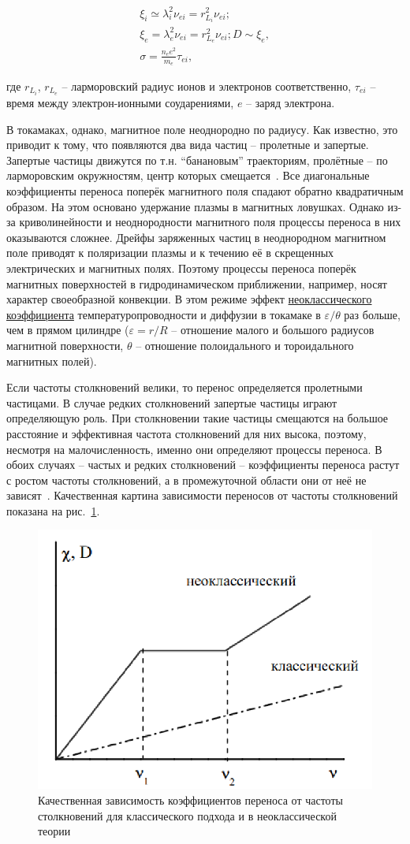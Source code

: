 \documentclass[10pt, a4paper]{article}
\begin{document}
\begin{align*}
	\xi_i \simeq \lambda_i^2\nu_{ei} = r_{L_{i}}^2\nu_{ei}; \\
	\xi_e = \lambda_e^2\nu_{ei} = r_{L_{e}}^2\nu_{ei};
	D \sim \xi_e, \\
	\sigma = \frac{n_e e^2}{m_e}\tau_{ei},
\end{align*}

где $r_{L_{i}}$, $r_{L_{e}}$ -- ларморовский радиус ионов и электронов соответственно, $\tau_{ei}$ -- время между электрон-ионными соударениями, $e$ -- заряд электрона.

В токамаках, однако, магнитное поле неоднородно по радиусу. Как известно, это приводит к тому, что появляются два вида частиц -- пролетные и запертые. Запертые частицы движутся по т.н. ``банановым'' траекториям, пролётные -- по ларморовским окружностям, центр которых смещается~\cite{kirneva}. Все диагональные коэффициенты переноса поперёк магнитного поля спадают обратно квадратичным образом. На этом основано удержание плазмы в магнитных ловушках. Однако из-за криволинейности и неоднородности магнитного поля процессы переноса в них оказываются сложнее. Дрейфы заряженных частиц в неоднородном магнитном поле приводят к поляризации плазмы и к течению её в скрещенных электрических и магнитных полях. Поэтому процессы переноса поперёк магнитных поверхностей в гидродинамическом приближении, например, носят характер своеобразной конвекции. В этом режиме эффект \uline{неоклассического коэффициента} температуропроводности и диффузии в токамаке в $\varepsilon/\theta$ раз больше, чем в прямом цилиндре ($\varepsilon=r/R$ -- отношение малого и большого радиусов магнитной поверхности, $\theta$ -- отношение полоидального и тороидального магнитных полей).

Если частоты столкновений велики, то перенос определяется пролетными частицами. В случае редких столкновений запертые частицы играют определяющую роль. При столкновении такие частицы смещаются на большое расстояние и эффективная частота столкновений для них высока, поэтому, несмотря на малочисленность, именно они определяют процессы переноса. В обоих случаях -- частых и редких столкновений -- коэффициенты переноса растут с ростом частоты столкновений, а в промежуточной области они от неё не зависят~\cite{kirneva}. Качественная картина зависимости переносов от частоты столкновений показана на рис.~\ref{fig:neoclassic_diffusion}. 

\begin{figure}[ht]
	\begin{center}
		\includegraphics[width=0.35\linewidth]{neoclassic_diffusion}
	\end{center}
	\caption{Качественная зависимость коэффициентов переноса от частоты столкновений для классического подхода и в неоклассической теории~\cite{kirneva}}		
	\label{fig:neoclassic_diffusion}
\end{figure}
\end{document}
